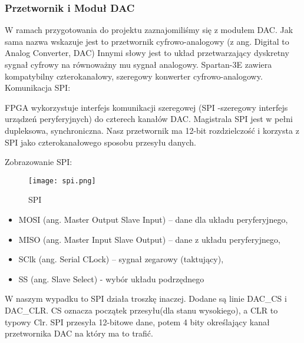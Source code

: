 \documentclass[11pt]{report}
\begin{document}
\subsubsection{Przetwornik i Moduł DAC}
    \par  W ramach przygotowania do projektu zaznajomiliśmy się z modułem DAC. Jak sama nazwa wskazuje jest to przetwornik cyfrowo-analogowy (z ang. Digital to Analog Converter, DAC) Innymi słowy jest to układ przetwarzający dyskretny sygnał cyfrowy na równoważny mu sygnał analogowy.
   Spartan-3E zawiera kompatybilny czterokanałowy, szeregowy konwerter cyfrowo-analogowy.  
    \vspace{5mm}
    Komunikacja SPI:
    \par  FPGA wykorzystuje interfejs komunikacji szeregowej (SPI -szeregowy interfejs urządzeń peryferyjnych) do czterech kanałów DAC. Magistrala SPI jest w pełni dupleksowa, synchroniczna. Nasz przetwornik ma 12-bit rozdzielczość i korzysta z SPI jako czterokanałowego sposobu przesyłu danych. 

    \vspace{10mm}
    
     Zobrazowanie SPI:

    \begin{figure}[h]
    	\centering
    	\texttt{[image: spi.png]}
    	\caption{SPI}
	    \label{fig:ps2}
    \end{figure}
    
    \begin{itemize}
	    \item MOSI (ang. Master Output Slave Input) – dane dla układu peryferyjnego,
	    \item MISO (ang. Master Input Slave Output) – dane z układu peryferyjnego, 
	    \item SClk (ang. Serial CLock) – sygnał zegarowy (taktujący), 
	    \item SS (ang. Slave Select) - wybór układu podrzędnego
	\end{itemize}
	\vspace{5mm}
    
     \par W naszym wypadku to SPI działa troszkę inaczej. Dodane są linie DAC\_CS i DAC\_CLR. \newline CS oznacza początek przesyłu(dla stanu wysokiego), a CLR to typowy Clr. SPI przesyła 12-bitowe dane, potem 4 bity określający kanał przetwornika DAC na który ma to trafić.
 
	\vspace{10mm}
\end{document}
